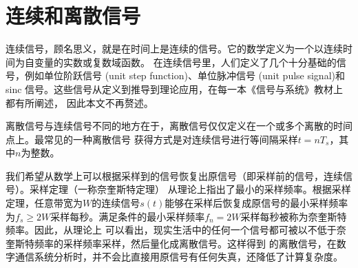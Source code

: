 \section{连续和离散信号}\label{ContinuousandDiscreteSignal}
连续信号，顾名思义，就是在时间上是连续的信号。它的数学定义为一个以连续时间为自变量的实数或复数域函数。
在连续信号里，人们定义了几个十分基础的信号，例如单位阶跃信号 (unit step function)、单位脉冲信号 (unit
pulse signal)和 sinc 信号。这些信号从定义到推导到理论应用，在每一本《信号与系统》教材上都有所阐述，
因此本文不再赘述。
\par
离散信号与连续信号不同的地方在于，离散信号仅仅定义在一个或多个离散的时间点上。最常见的一种离散信号
获得方式是对连续信号进行等间隔采样$t = nT_{s}$，其中$n$为整数。
\par
\label{SamplingTheory}我们希望从数学上可以根据采样到的信号恢复出原信号（即采样前的信号，连续信号）。采样定理（一称奈奎斯特定理）
从理论上指出了最小的采样频率。根据采样定理，任意带宽为$W$的连续信号$s(t)$能够在采样后恢复成原信号的最小采样频率
为$f_{s} \geq 2W$采样每秒。满足条件的最小采样频率$f_{n} = 2W$采样每秒被称为奈奎斯特频率。因此，从理论上
可以看出，现实生活中的任何一个信号都可被以不低于奈奎斯特频率的采样频率采样，然后量化成离散信号。这样得到
的离散信号，在数字通信系统分析时，并不会比直接用原信号有任何失真，还降低了计算复杂度。
